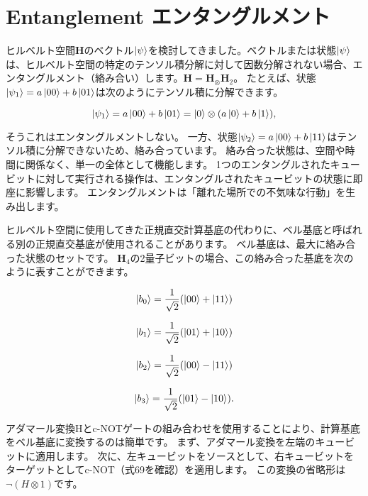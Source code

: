 \section{Entanglement エンタングルメント}

ヒルベルト空間$\mathbf{H}$のベクトル$\ket{\psi}$を検討してきました。ベクトルまたは状態$\ket{\psi}$は、ヒルベルト空間の特定のテンソル積分解に対して因数分解されない場合、エンタングルメント（絡み合い）します。$ \mathbf{H} =\mathbf{H}_  \otimes \mathbf{H}_2$。 たとえば、状態$\ket{\psi_1} = a \ket{00} + b \ket{01}$は次のようにテンソル積に分解できます。

\begin{equation}
\label{124}
\ket{\psi_1}
=
a \ket{00} + b \ket{01} 
=
\ket{0} \otimes (a\ket{0} + b \ket{1}), 
\end{equation}

そうこれはエンタングルメントしない。 一方、状態$\ket{\psi_2} = a \ket{00} + b \ket{11}$はテンソル積に分解できないため、絡み合っています。 絡み合った状態は、空間や時間に関係なく、単一の全体として機能します。 1つのエンタングルされたキュービットに対して実行される操作は、エンタングルされたキュービットの状態に即座に影響します。 エンタングルメントは「離れた場所での不気味な行動」を生み出します。

ヒルベルト空間に使用してきた正規直交計算基底の代わりに、ベル基底と呼ばれる別の正規直交基底が使用されることがあります。 ベル基底は、最大に絡み合った状態のセットです。 $\mathbf{H}_4$の2量子ビットの場合、この絡み合った基底を次のように表すことができます。


\begin{equation}
\label{125}
\ket{b_0} 
= \frac{1}{\sqrt{2}}(\ket{00} + \ket{11})
\end{equation}

\begin{equation}
\label{126}
\ket{b_1} = \frac{1}{\sqrt{2}}(\ket{01} + \ket{10})
\end{equation}

\begin{equation}
\label{127}
\ket{b_2} = \frac{1}{\sqrt{2}}(\ket{00} - \ket{11})
\end{equation}

\begin{equation}
\label{128}
\ket{b_3} = \frac{1}{\sqrt{2}}(\ket{01} - \ket{10}).
\end{equation}

アダマール変換Hとc-NOTゲートの組み合わせを使用することにより、計算基底をベル基底に変換するのは簡単です。 まず、アダマール変換を左端のキュービットに適用します。 次に、左キュービットをソースとして、右キュービットをターゲットとしてc-NOT（式69を確認）を適用します。 この変換の省略形は$\lnot (H \otimes 1 )$です。

